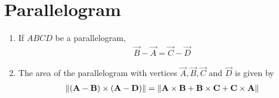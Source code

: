 \section{Parallelogram}
\begin{enumerate}[label=\thesection.\arabic*.,ref=\thesection.\theenumi]
  \item If $ABCD$ be a parallelogram,
	  \label{prop:two-pgm}
  \begin{align}
	  \label{eq:two-pgm}
 \vec{B}-\vec{A} = \vec{C} -\vec{D}
  \end{align}
\item The area of the parallelogram with vertices $\vec{A}, \vec{B}, \vec{C}$ and $\vec{D}$ is given by 
  \label{prop:pgm2d}
\begin{align}
  \label{eq:pgm2d}
	\norm{\brak{\vec{A}-\vec{B}} \times \brak{\vec{A}-\vec{D}}}
 = 
 \norm{\vec{A} \times \vec{B}+\vec{B} \times \vec{C}+\vec{C} \times \vec{A}}
  \end{align}
\end{enumerate}
